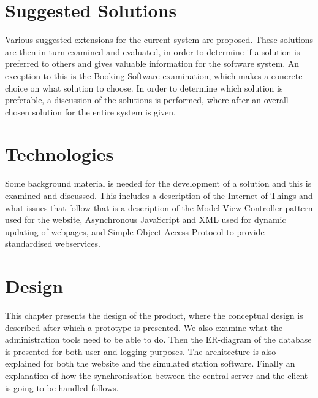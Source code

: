 	\chapter{Suggested Solutions}
	Various suggested extensions for the current system are proposed.
	These solutions are then in turn examined and evaluated, in order to determine if a solution is preferred to others and gives valuable information for the software system.
	An exception to this is the Booking Software examination, which makes a concrete choice on what solution to choose. 
	In order to determine which solution is preferable, a discussion of the solutions is performed, where after an overall chosen solution for the entire system is given.
	
	
	
	
	
	
	\chapter{Technologies}
	Some background material is needed for the development of a solution and this is examined and discussed. This includes a description of the Internet of Things and what issues that follow that is a description of the Model-View-Controller pattern used for the website, Asynchronous JavaScript and XML used for dynamic updating of webpages, and Simple Object Access Protocol to provide standardised webservices.
	
	
	
    
		
	\chapter{Design}
	This chapter presents the design of the product, where the conceptual design is described after which a prototype is presented.
    We also examine what the administration tools need to be able to do.
	Then the ER-diagram of the database is presented for both user and logging purposes. 
	The architecture is also explained for both the website and the simulated station software. 
	Finally an explanation of how the synchronisation between the central server and the client is going to be handled follows.
	
	
	
	
	
	
	
	

